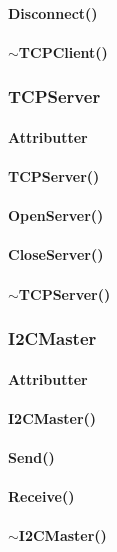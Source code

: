 \paragraph{Disconnect()}
\paragraph{$\sim$TCPClient()}


\subsubsection{TCPServer}
\paragraph{Attributter}
\paragraph{TCPServer()}
\paragraph{OpenServer()}
\paragraph{CloseServer()}
\paragraph{$\sim$TCPServer()}


\subsubsection{I2CMaster}
\paragraph{Attributter}
\paragraph{I2CMaster()}
\paragraph{Send()}
\paragraph{Receive()}
\paragraph{$\sim$I2CMaster()}


